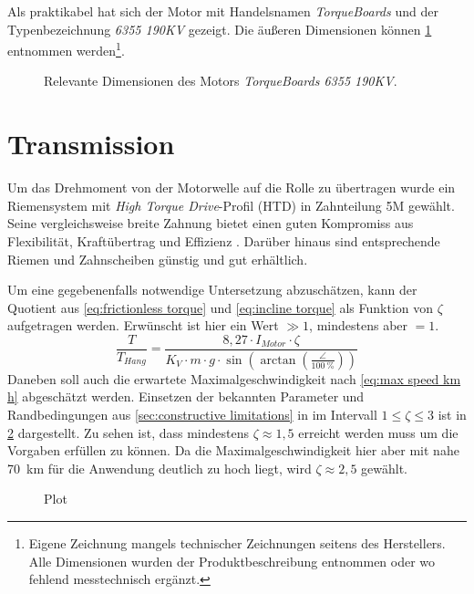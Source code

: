 	Als praktikabel hat sich der Motor mit Handelsnamen \textit{TorqueBoards} und der Typenbezeichnung \textit{6355 190KV} gezeigt.
	Die äußeren Dimensionen können \cref{fig:motor} entnommen werden\footnote{Eigene Zeichnung mangels technischer Zeichnungen seitens des Herstellers.
	Alle Dimensionen wurden der Produktbeschreibung entnommen oder wo fehlend messtechnisch ergänzt.}.
	\begin{figure}[h]
		\centering
		
		\caption{Relevante Dimensionen des Motors \textit{TorqueBoards 6355 190KV}.}%
		\label{fig:motor}
	\end{figure}
	\section{Transmission}\label{sec:transmission}
		Um das Drehmoment von der Motorwelle auf die Rolle zu übertragen wurde ein Riemensystem mit \textit{High Torque Drive}-Profil (HTD) in Zahnteilung 5M gewählt. 
		Seine vergleichsweise breite Zahnung bietet einen guten Kompromiss aus Flexibilität, Kraftübertrag und Effizienz \cite{gates.catalogue.2021}.
		Darüber hinaus sind entsprechende Riemen und Zahnscheiben günstig und gut erhältlich.\par\medskip
		Um eine gegebenenfalls notwendige Untersetzung abzuschätzen, kann der Quotient aus \cref{eq:frictionless torque} und \cref{eq:incline torque} als Funktion von \(\zeta\) aufgetragen werden.
		Erwünscht ist hier ein Wert \(\gg 1\), mindestens aber \(= 1\).
		\begin{equation}
			\frac{T}{T_{Hang}} = \frac{8,27 \cdot I_{Motor} \cdot \zeta}{K_V \cdot m \cdot g \cdot \sin\left(\arctan\left(\frac{\angle}{\qty{100}{\percent}}\right)\right)}
			\label{eq:torque ratio}
		\end{equation}
		Daneben soll auch die erwartete Maximalgeschwindigkeit nach \cref{eq:max speed km h} abgeschätzt werden.
		Einsetzen der bekannten Parameter und Randbedingungen aus \cref{sec:constructive limitations} in  im Intervall \(1 \leq \zeta \leq 3\) ist in \cref{fig:torque ratio and vmax vs zetas} dargestellt.
		Zu sehen ist, dass mindestens \(\zeta \approx 1,5\) erreicht werden muss um die Vorgaben erfüllen zu können.
		Da die Maximalgeschwindigkeit hier aber mit nahe \qty{70}{\kilo\metre} für die Anwendung deutlich zu hoch liegt, wird \(\zeta \approx 2,5\) gewählt.
		\begin{figure}[h]
			\centering
			
			\caption{Plot}
			\label{fig:torque ratio and vmax vs zetas}
		\end{figure}
		
